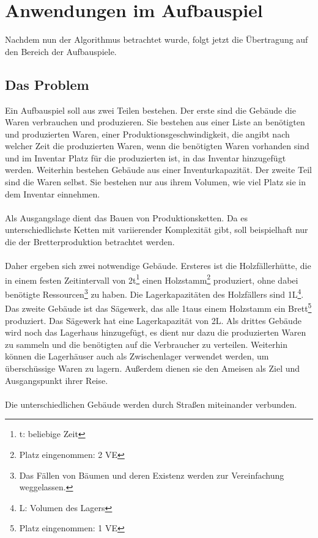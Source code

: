 \documentclass[12pt]{article}
\begin{document}
\section{Anwendungen im Aufbauspiel}
Nachdem nun der Algorithmus betrachtet wurde, folgt jetzt die Übertragung auf den Bereich der Aufbauspiele.

\subsection{Das Problem}
Ein Aufbauspiel soll aus zwei Teilen bestehen. Der erste sind die Gebäude die Waren verbrauchen und produzieren. Sie bestehen aus einer Liste an benötigten und produzierten Waren, einer Produktionsgeschwindigkeit, die angibt nach welcher Zeit die produzierten Waren, wenn die benötigten Waren vorhanden sind und im Inventar Platz für die produzierten ist, in das Inventar hinzugefügt werden. Weiterhin bestehen Gebäude aus einer Inventurkapazität.
Der zweite Teil sind die Waren selbst. Sie bestehen nur aus ihrem Volumen, wie viel Platz sie in dem Inventar einnehmen.\\\\
Als Ausgangslage dient das Bauen von Produktionsketten. Da es unterschiedlichste Ketten mit variierender Komplexität gibt, soll beispielhaft nur die der Bretterproduktion betrachtet werden.\\\\
Daher ergeben sich zwei notwendige Gebäude. Ersteres ist die Holzfällerhütte, die in einem festen Zeitintervall von 2t\footnote{t: beliebige Zeit} einen Holzstamm\footnote{Platz eingenommen: 2 VE} produziert, ohne dabei benötigte Ressourcen\footnote{Das Fällen von Bäumen und deren Existenz werden zur Vereinfachung weggelassen.} zu haben. Die Lagerkapazitäten des Holzfällers sind 1L\footnote{L: Volumen des Lagers}. Das zweite Gebäude ist das Sägewerk, das alle 1t\footnotemark[3] aus einem Holzstamm ein Brett\footnote{Platz eingenommen: 1 VE} produziert. Das Sägewerk hat eine Lagerkapazität von 2L\footnotemark[6]. 
Als drittes Gebäude wird noch das Lagerhaus hinzugefügt, es dient nur dazu die produzierten Waren zu sammeln und die benötigten auf die Verbraucher zu verteilen. Weiterhin können die Lagerhäuser auch als Zwischenlager verwendet werden, um überschüssige Waren zu lagern. Außerdem dienen sie den Ameisen als Ziel und Ausgangspunkt ihrer Reise.\\\\
Die unterschiedlichen Gebäude werden durch Straßen miteinander verbunden.
\end{document}
